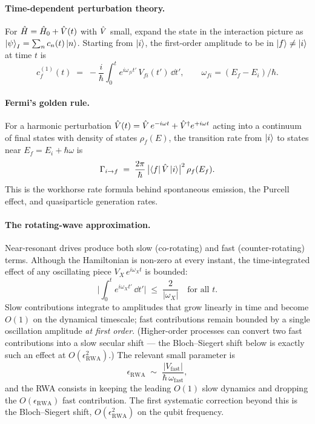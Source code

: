 \clearpage
\begin{chaptersummary}

\paragraph{Time-dependent perturbation theory.}
For $\hat{H}=\hat{H}_0+\hat{V}(t)$ with $\hat{V}$ small, expand the
state in the interaction picture as
$\ket{\psi}_I=\sum_n c_n(t)\ket{n}$. Starting from $\ket{i}$, the
first-order amplitude to be in $\ket{f}\neq\ket{i}$ at time $t$ is
\begin{equation}
c_f^{(1)}(t) \;=\; -\frac{i}{\hbar}\int_0^t e^{i\omega_{fi}t'}\,V_{fi}(t')\,\dd t',
\qquad \omega_{fi}=(E_f-E_i)/\hbar.
\end{equation}

\paragraph{Fermi's golden rule.}
For a harmonic perturbation
$\hat{V}(t)=\hat{V}\,e^{-i\omega t}+\hat{V}^\dagger e^{+i\omega t}$ acting
into a continuum of final states with density of states
$\rho_f(E)$, the transition rate from $\ket{i}$ to states near
$E_f=E_i+\hbar\omega$ is
\begin{equation}
\Gamma_{i\to f} \;=\; \frac{2\pi}{\hbar}\,\bigl|\bra{f}\hat{V}\ket{i}\bigr|^2\,\rho_f(E_f).
\end{equation}
This is the workhorse rate formula behind spontaneous emission, the
Purcell effect, and quasiparticle generation rates.

\paragraph{The rotating-wave approximation.}
Near-resonant drives produce both slow (co-rotating) and fast
(counter-rotating) terms. Although the Hamiltonian is non-zero at
every instant, the time-integrated effect of any oscillating piece
$V_X\,e^{i\omega_X t}$ is bounded:
\begin{equation}
\biggl|\int_0^t e^{i\omega_X t'}\,\dd t'\biggr| \;\leq\; \frac{2}{|\omega_X|}
\quad\text{for all }t.
\end{equation}
Slow contributions integrate to amplitudes that grow linearly in
time and become $O(1)$ on the dynamical timescale; fast contributions
remain bounded by a single oscillation amplitude \emph{at first
order}. (Higher-order processes can convert two fast contributions
into a slow secular shift --- the Bloch--Siegert shift below is
exactly such an effect at $O(\epsilon_\text{RWA}^2)$.) The
relevant small parameter is
\begin{equation}
\epsilon_\text{RWA} \;\sim\; \frac{|V_\text{fast}|}{\hbar\,\omega_\text{fast}},
\end{equation}
and the RWA consists in keeping the leading $O(1)$ slow dynamics
and dropping the $O(\epsilon_\text{RWA})$ fast contribution. The
first systematic correction beyond this is the Bloch--Siegert
shift, $O(\epsilon_\text{RWA}^2)$ on the qubit frequency.

\end{chaptersummary}

